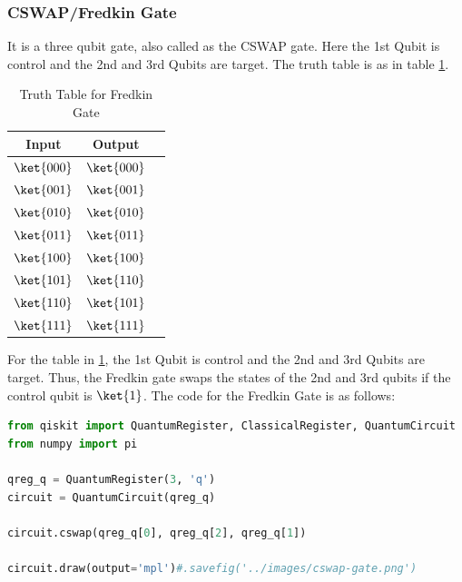 \documentclass[12pt, oneside]{book}
\theoremstyle{definition}
\theoremstyle{definition}
\theoremstyle{remark}
\begin{document}
\subsubsection{CSWAP/Fredkin Gate}\label{qgate:cswap}
It is a three qubit gate, also called as the CSWAP gate.
Here the 1st Qubit is control and the 2nd and 3rd Qubits are target.
The truth table is as in table \ref{tab:fredkin}.
\begin{table}[H]
    \centering
    \begin{tabular}{|c|c|c|}
        \hline
        Input & Output\\
        \hline
        $\ket{000}$ & $\ket{000}$\\
        $\ket{001}$   & $\ket{001}$\\
        $\ket{010}$   & $\ket{010}$\\
        $\ket{011}$  & $\ket{011}$\\
        $\ket{100}$ & $\ket{100}$\\
        $\ket{101}$   & $\ket{110}$\\
        $\ket{110}$   & $\ket{101}$\\
        $\ket{111}$  & $\ket{111}$\\
        \hline
    \end{tabular}
    \caption{Truth Table for Fredkin Gate}
    \label{tab:fredkin}
\end{table}
For the table in \ref{tab:fredkin}, the 1st Qubit is control and the 2nd and 3rd Qubits are target.
Thus, the Fredkin gate swaps the states of the 2nd and 3rd qubits if the control qubit is $\ket{1}$.
The code for the Fredkin Gate is as follows:
\begin{lstlisting}[language=Python]
from qiskit import QuantumRegister, ClassicalRegister, QuantumCircuit
from numpy import pi

qreg_q = QuantumRegister(3, 'q')
circuit = QuantumCircuit(qreg_q)

circuit.cswap(qreg_q[0], qreg_q[2], qreg_q[1])

circuit.draw(output='mpl')#.savefig('../images/cswap-gate.png')
\end{lstlisting}
\end{document}
